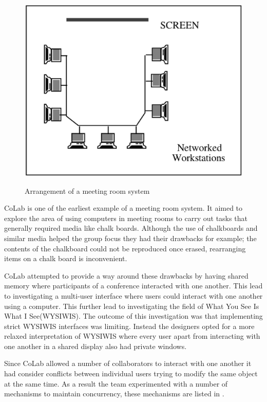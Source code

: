 \begin{figure}[htp]
  \caption{Arrangement of a meeting room system\cite{journals/iwc/Rodden91}}
  \centering
  \includegraphics[scale=.5]{meeting_room_sys.eps}
  \label{meeting_room_fig}
\end{figure}



CoLab\cite{Stefik:1987:BCU} is one of the earliest example of a
meeting room system. It aimed to explore the area of using computers
in meeting rooms to carry out tasks that generally required media like
chalk boards. Although the use of chalkboards and similar media
helped the group focus they had their drawbacks for example; the
contents of the chalkboard could not be reproduced once erased,
rearranging items on a chalk board is inconvenient. 

CoLab attempted to provide a way around these drawbacks by having
shared memory where participants of a conference interacted with one
another. This lead to investigating a multi-user interface where users
could interact with one another using a computer. This further lead to
investigating the field of What You See Is What I See(WYSIWIS). The
outcome of this investigation was that implementing strict WYSIWIS
interfaces was limiting. Instead the designers opted for a more relaxed
interpretation of WYSIWIS where every user apart from interacting with
one another in a shared display also had private windows. 

Since CoLab allowed a number of collaborators to interact with one
another it had consider conflicts between individual users trying to
modify the same object at the same time. As a result the team
experimented with a number of mechanisms to maintain
concurrency, these mechanisms are listed in \cite{Stefik:1987:BCU}.

